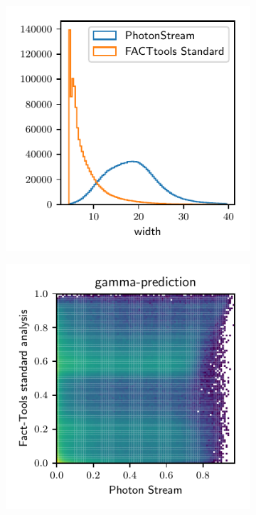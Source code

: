\begin{figure}
\begin{subfigure}{0.5\textwidth}
    \includegraphics[width=\textwidth, page=2]{Plots/std_phs_comparison_hist_same_DBSCAN_crab.pdf}
  \end{subfigure}
  \begin{subfigure}{0.5\textwidth}
    \centering
    \includegraphics[width=\textwidth, page=3]{Plots/comparison_data_dl3.pdf}

\end{subfigure}
\end{figure}
